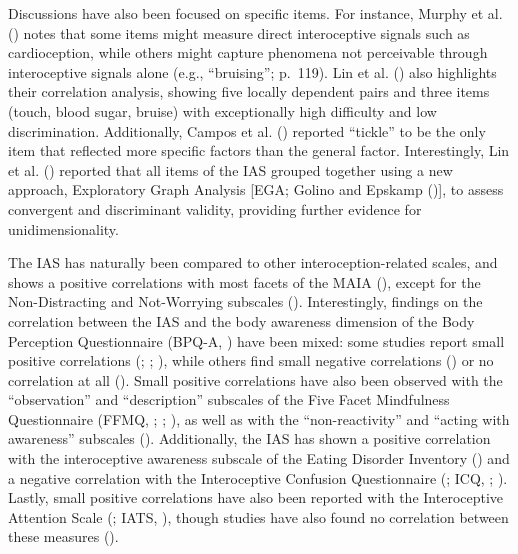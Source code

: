 \documentclass[
  man,
  floatsintext,
  longtable,
  nolmodern,
  notxfonts,
  notimes,
  colorlinks=true,linkcolor=blue,citecolor=blue,urlcolor=blue]{apa7}
\begin{document}
Discussions have also been focused on specific items. For instance,
Murphy et al. () notes that some items
might measure direct interoceptive signals such as cardioception, while
others might capture phenomena not perceivable through interoceptive
signals alone (e.g., ``bruising''; p.~119). Lin et al.
() also highlights their correlation
analysis, showing five locally dependent pairs and three items (touch,
blood sugar, bruise) with exceptionally high difficulty and low
discrimination. Additionally, Campos et al.
() reported ``tickle'' to be the only
item that reflected more specific factors than the general factor.
Interestingly, Lin et al. () reported that
all items of the IAS grouped together using a new approach, Exploratory
Graph Analysis {[}EGA; Golino and Epskamp
(){]}, to assess convergent
and discriminant validity, providing further evidence for
unidimensionality.

The IAS has naturally been compared to other interoception-related
scales, and shows a positive correlations with most facets of the MAIA
(),
except for the Non-Distracting and Not-Worrying subscales
(). Interestingly, findings
on the correlation between the IAS and the body awareness dimension of
the Body Perception Questionnaire (BPQ-A,
) have been mixed: some
studies report small positive correlations
(;
;
), while others find
small negative correlations ()
or no correlation at all (). Small positive correlations have also been observed with the
``observation'' and ``description'' subscales of the Five Facet
Mindfulness Questionnaire (FFMQ, ; ;
), as well as with the
``non-reactivity'' and ``acting with awareness'' subscales
(). Additionally, the IAS
has shown a positive correlation with the interoceptive awareness
subscale of the Eating Disorder Inventory () and a negative correlation with the Interoceptive Confusion
Questionnaire (; ICQ,
;
). Lastly, small positive
correlations have also been reported with the Interoceptive Attention
Scale (; IATS,
), though studies have also
found no correlation between these measures
().
\end{document}
